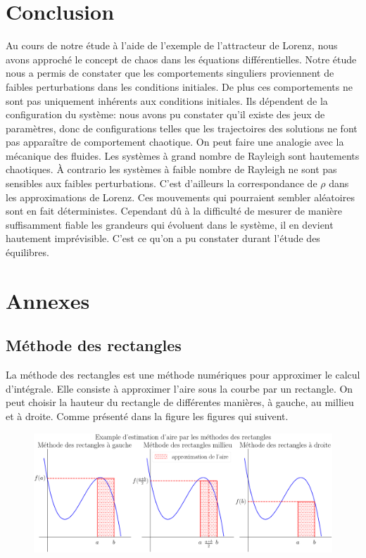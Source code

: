 \documentclass{article}
\newtheorem[M , nocut]{prop}{Proposition}[section]
\newtheorem[M , nocut]{definition}{Définition}
\newtheorem[M , nocut]{lemme}{Lemme}
\newtheorem[L , nocut]{thm}{Théoreme}
\newtheorem[M , nocut]{cor}{Corollaire}
\begin{document}
\newpage
\section{Conclusion}

Au cours de notre étude à l'aide de l'exemple de l'attracteur de Lorenz, nous avons approché le concept de chaos dans les équations différentielles. Notre étude nous a permis de constater que les comportements singuliers proviennent de faibles perturbations dans les conditions initiales. De plus ces comportements ne sont pas uniquement inhérents aux conditions initiales. Ils dépendent de la configuration du système: nous avons pu constater qu'il existe des jeux de paramètres, donc de configurations telles que les trajectoires des solutions ne font pas apparaître de comportement chaotique. On peut faire une analogie avec la mécanique des fluides. Les systèmes à grand nombre de Rayleigh sont hautements chaotiques. \`A contrario les systèmes à faible nombre de Rayleigh ne sont pas sensibles aux faibles perturbations. C'est d'ailleurs la correspondance de $\rho$ dans les approximations de Lorenz. Ces mouvements qui pourraient sembler aléatoires sont en fait déterministes. Cependant dû à la difficulté de mesurer de manière suffisamment fiable les grandeurs qui évoluent dans le système, il en devient hautement imprévisible. C'est ce qu'on a pu constater durant l'étude des équilibres.

\newpage
\section{Annexes}
\subsection*{Méthode des rectangles}
La méthode des rectangles est une méthode numériques pour approximer le calcul d'intégrale. Elle consiste à approximer l'aire sous la courbe par un rectangle. On peut choisir la hauteur du rectangle de différentes manières, à gauche, au millieu et à droite. Comme présenté dans la figure les figures qui suivent.
\begin{figure}[ht]
    \includegraphics[width=\textwidth]{MethodeRect}
\end{figure}
\end{document}
